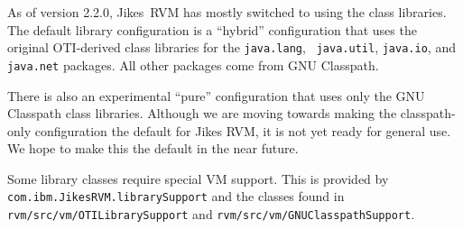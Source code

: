 As of version 2.2.0, Jikes\JikesTMFootnote\ RVM has mostly switched to
using the  class libraries.  The
default library configuration is a ``hybrid'' configuration that uses
the original OTI-derived class libraries for the {\tt java.lang}, {\tt
java.util}, {\tt java.io}, and {\tt java.net} packages.  All other
packages come from GNU Classpath. 

There is also an experimental ``pure'' configuration that uses only
the GNU Classpath class libraries. Although we are moving towards
making the classpath-only configuration the default for Jikes RVM, it
is not yet ready for general use. We hope to make this the default in
the near future.

Some library classes require special VM support.  This is provided by
{\tt com.ibm.JikesRVM.librarySupport} and the classes found in
{\tt rvm/src/vm/OTILibrarySupport} and {\tt rvm/src/vm/GNUClasspathSupport}. 

\JikesTMFooter

